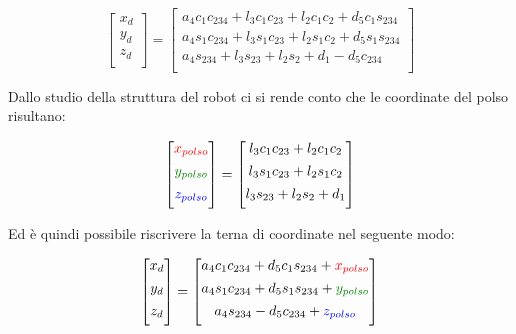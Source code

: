 \documentclass[a4paper]{article}
\begin{document}
    \[
    \begin{bmatrix}
        x_d\\[1ex]
        y_d\\[1ex]
        z_d\\[1ex]
    \end{bmatrix}
    =
    \begin{bmatrix}
        a_4 c_1 c_{234} + l_3 c_1 c_{23} + l_2 c_1 c_2 + d_5 c_1 s_{234}\\[1ex]
        a_4 s_1 c_{234} + l_3 s_1 c_{23} + l_2 s_1 c_2 + d_5 s_1 s_{234}\\[1ex]
        a_4 s_{234} + l_3 s_{23} + l_2 s_2 + d_1 - d_5 c_{234}\\[1ex] 
    \end{bmatrix}
    \]
    
    \begin{text}
        Dallo studio della struttura del robot ci si rende conto che le coordinate del polso risultano:
    \end{text}
    
    \[
    \begin{bmatrix}
        \textcolor{red}{x_{polso}}\\[1ex]
        \textcolor[rgb]{0.004, 0.5, 0.004}{y_{polso}}\\[1ex]
        \textcolor{blue}{z_{polso}}\\[1ex]
    \end{bmatrix}
    =
    \begin{bmatrix}
        l_3 c_1 c_{23} + l_2 c_1 c_2\\[1ex]
        l_3 s_1 c_{23} + l_2 s_1 c_2\\[1ex]
        l_3 s_{23} + l_2 s_2 + d_1\\[1ex] 
    \end{bmatrix}
    \]
    
    \begin{text}
        Ed è quindi possibile riscrivere la terna di coordinate nel seguente modo:
    \end{text}
    
    \[
    \begin{bmatrix}
        x_d\\[1ex]
        y_d\\[1ex]
        z_d\\[1ex]
    \end{bmatrix}
    =
    \begin{bmatrix}
        a_4 c_1 c_{234} + d_5 c_1 s_{234} + \textcolor{red}{x_{polso}}\\[1ex]
        a_4 s_1 c_{234} + d_5 s_1 s_{234} +  \textcolor[rgb]{0.004, 0.5, 0.004}{y_{polso}}\\[1ex]
        a_4 s_{234} - d_5 c_{234} +  \textcolor{blue}{z_{polso}}\\[1ex] 
    \end{bmatrix}
    \]
    
\end{document}
